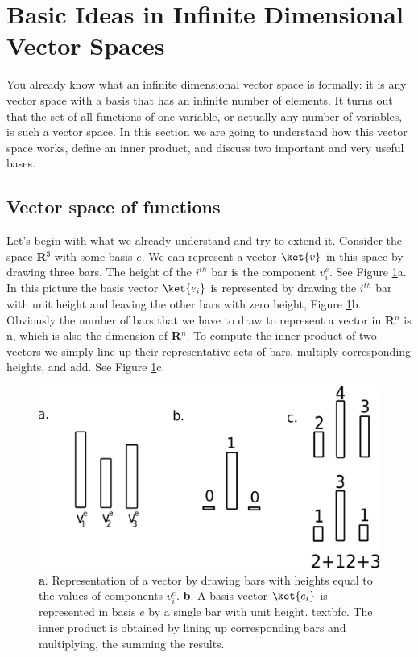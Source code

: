 \section{Basic Ideas in Infinite Dimensional Vector Spaces}
You already know what an infinite dimensional vector space is formally: it is any vector space with a basis that has an infinite number of elements. It turns out that the set of all functions of one variable, or actually any number of variables, is such a vector space. In this section we are going to understand how this vector space works, define an inner product, and discuss two important and very useful bases.

\subsection{Vector space of functions}
Let's begin with what we already understand and try to extend it.  Consider the space \textbf{R}$^3$ with some basis $e$.  We can represent a vector $\ket{v}$ in this space by drawing three bars.  The height of the $i^{th}$ bar is the component $v^e_i$.  See Figure \ref{Fig:columnsFinite}a.  In this picture the basis vector $\ket{e_i}$ is represented by drawing the $i^{th}$ bar with unit height and leaving the other bars with zero height, Figure \ref{Fig:columnsFinite}b. Obviously the number of bars that we have to draw to represent a vector in \textbf{R}$^n$ is n, which is also the dimension of \textbf{R}$^n$.  To compute the inner product of two vectors we simply line up their representative sets of bars, multiply corresponding heights, and add. See Figure \ref{Fig:columnsFinite}c.

\begin{figure}
\begin{centering}
\includegraphics[width=12cm]{columns_finite.pdf}
\par\end{centering}
\caption{\textbf{a}. Representation of a vector by drawing bars with heights equal to the values of components $v_i^e$. \textbf{b}. A basis vector $\ket{e_i}$ is represented in basis $e$ by a single bar with unit height. textbf{c}. The inner product is obtained by lining up corresponding bars and multiplying, the summing the results.}
\label{Fig:columnsFinite}
\end{figure}

